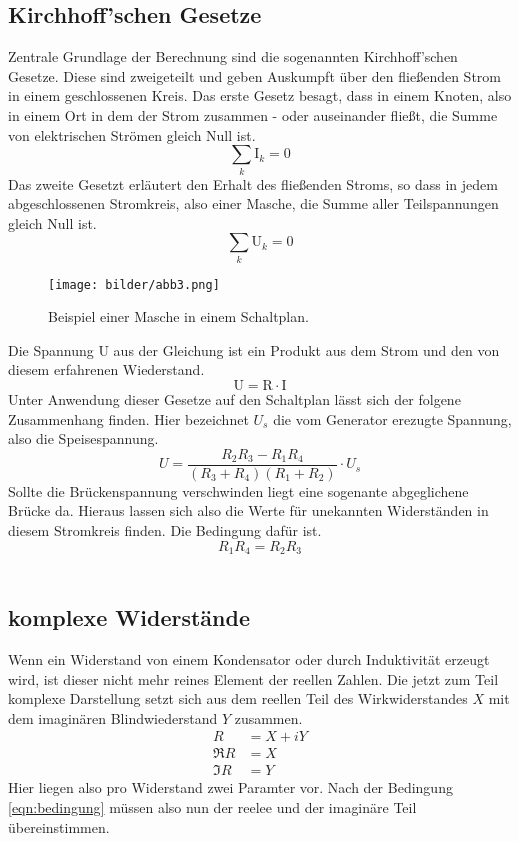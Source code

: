 \subsection{Kirchhoff'schen Gesetze}
Zentrale Grundlage der Berechnung sind die sogenannten Kirchhoff'schen Gesetze. Diese sind zweigeteilt und 
geben Auskumpft über den fließenden Strom in einem geschlossenen Kreis.
Das erste Gesetz besagt, dass in einem Knoten, also in einem Ort in dem der Strom zusammen - oder auseinander fließt, 
die Summe von elektrischen Strömen gleich Null ist.
\begin{equation}
    \sum_k \text{I}_k = 0
\end{equation}
Das zweite Gesetzt erläutert den Erhalt des fließenden Stroms, so dass in jedem abgeschlossenen Stromkreis, also einer Masche,
die Summe aller Teilspannungen gleich Null ist.
\begin{equation}
    \label{eqn:kirch2}
    \sum_k \text{U}_k = 0
\end{equation}
\begin{figure}
    \centering
    \texttt{[image: bilder/abb3.png]}
    \caption{Beispiel einer Masche in einem Schaltplan. \cite{skript}} 
    \label{fig:abb3}
\end{figure}
Die Spannung U aus der Gleichung ist ein Produkt aus dem Strom und den von diesem erfahrenen Wiederstand.
\begin{equation}
    \text{U} = \text{R}\cdot \text{I}
\end{equation}
Unter Anwendung dieser Gesetze auf den Schaltplan %
lässt sich der folgene Zusammenhang finden. Hier bezeichnet $U_s$ die vom Generator erezugte Spannung, also die Speisespannung. 
\begin{equation}
     U= \frac{R_2R_3 - R_1R_4}{(R_3+R_4)(R_1+R_2)}\cdot U_s
\end{equation}
Sollte die Brückenspannung verschwinden liegt eine sogenante abgeglichene Brücke da. 
Hieraus lassen sich also die Werte für unekannten Widerständen in diesem Stromkreis finden.
Die Bedingung dafür ist.
\begin{equation}
    \label{eqn:bedingung}
    R_1 R_4 = R_2 R_3
\end{equation}
\\
\newline
\subsection{komplexe Widerstände}
Wenn ein Widerstand von einem Kondensator oder durch Induktivität erzeugt wird, ist dieser nicht mehr reines 
Element der reellen Zahlen. 
Die jetzt zum Teil komplexe Darstellung setzt sich aus dem reellen Teil des Wirkwiderstandes $X$ mit 
dem imaginären Blindwiederstand $Y$ zusammen. 
\begin{align*}
    R &= X +iY \\
    \Re{R} &= X \\
    \Im{R} &= Y 
\end{align*} 
Hier liegen also pro Widerstand zwei Paramter vor. Nach der Bedingung \eqref{eqn:bedingung} müssen also
nun der reelee und der imaginäre Teil übereinstimmen. 
\\
\newline
